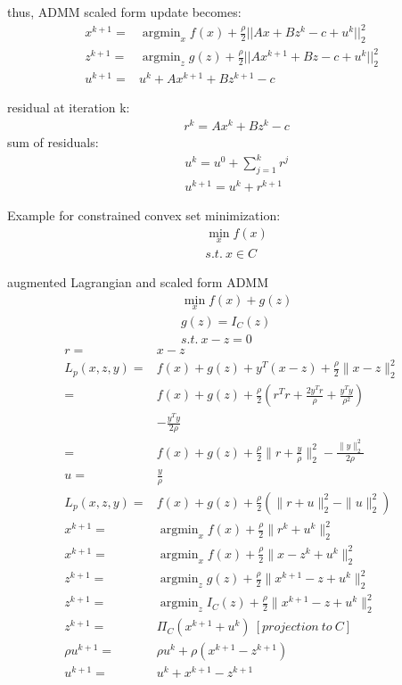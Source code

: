 \documentclass[8pt]{report}
\DeclareMathOperator*{\argmin}{argmin}
\newcommand{\norm}[1]{\|#1\|}
\begin{document}
\begin{multicols*}{2}
  thus, ADMM scaled form update becomes:
  \begin{align*}
    x^{k+1} = & \argmin_{x} f(x) + \frac{\rho}{2}||Ax + Bz^k - c + u^k||_2^2\\
    z^{k+1} = & \argmin_{z} g(z) + \frac{\rho}{2}||Ax^{k+1} + Bz - c + u^k||_2^2\\
    u^{k+1} = & u^k + Ax^{k+1} +Bz^{k+1} - c
  \end{align*}

  residual at iteration k:
  \begin{align*}
    &r^k = Ax^k + Bz^k - c
  \end{align*}
  sum of residuals:
  \begin{align*}
    &u^k = u^0 + \sum_{j=1}^{k} r^j\\
    &u^{k+1} = u^k + r^{k+1}
  \end{align*}


  \vfill\null
  \columnbreak
  
  Example for constrained convex set minimization:
  \begin{align*}
    &\min_x f(x)\\
    &s.t.\ x \in C
  \end{align*}

  augmented Lagrangian and scaled form ADMM
  \begin{align*}
    &\min_x f(x) + g(z)\\
    &g(z) = I_C(z)\\
    &s.t.\ x-z=0
  \end{align*}
  \begin{align*}
    r=&x-z\\
    L_p(x,z,y) =& f(x) + g(z) + y^T(x-z) + \frac{\rho}{2} \norm{x-z}_2^2\\
               =& f(x) + g(z) + \frac{\rho}{2}(r^T r + \frac{2 y^T r}{\rho} + \frac{y^T y}{\rho^2})\\
                & - \frac{y^T y}{2 \rho}\\
    =& f(x) + g(z) + \frac{\rho}{2} \norm{r+\frac{y}{\rho}}_2^2 - \frac{\norm{y}_2^2}{2\rho}\\
    u=& \frac{y}{\rho}\\
    L_p(x,z,y) =& f(x) + g(z) + \frac{\rho}{2}(\norm{r+u}_2^2 - \norm{u}_2^2)\\
    x^{k+1} =& \argmin_x f(x) + \frac{\rho}{2} \norm{r^k+u^k}_2^2\\
    x^{k+1} =& \argmin_x f(x) + \frac{\rho}{2} \norm{x-z^k+u^k}_2^2\\
    z^{k+1} =& \argmin_z g(z) + \frac{\rho}{2} \norm{x^{k+1}-z+u^k}_2^2\\
    z^{k+1} =& \argmin_z I_C(z) + \frac{\rho}{2} \norm{x^{k+1}-z+u^k}_2^2\\
    z^{k+1} =& \Pi_C(x^{k+1}+u^k)\ [projection\ to\ C]\\
    \rho u^{k+1} =& \rho u^k + \rho (x^{k+1} - z^{k+1})\\
    u^{k+1} =& u^k + x^{k+1} - z^{k+1}
  \end{align*}


\end{multicols*}
\end{document}
